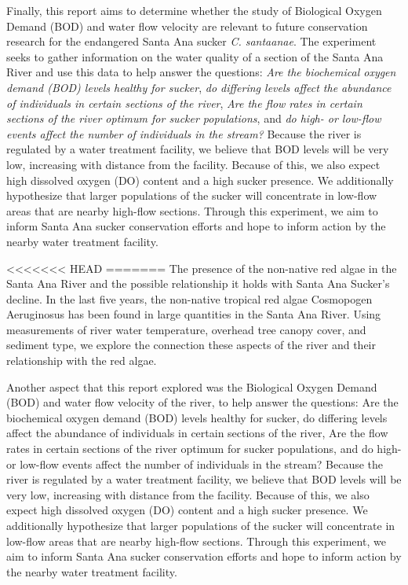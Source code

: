 \documentclass{article}\usepackage[]{graphicx}\usepackage[]{color}
\begin{document}
Finally, this report aims to determine whether the study of Biological Oxygen Demand (BOD) and water flow velocity are relevant to future conservation research for the endangered Santa Ana sucker \emph{C. santaanae}. The experiment seeks to gather information on the water quality of a section of the Santa Ana River and use this data to help answer the questions: \emph{Are the biochemical oxygen demand (BOD) levels healthy for sucker}, \emph{do differing levels affect the  abundance of individuals in certain sections of the river}, \emph{Are the flow rates in certain sections of the river optimum for sucker populations}, and \emph{do high- or low-flow events affect the number of individuals in the stream?} Because the river is regulated by a water treatment facility, we believe that BOD levels will be very low, increasing with distance from the facility. Because of this, we also expect high dissolved oxygen (DO) content and a high sucker presence. We additionally hypothesize that larger populations of the sucker will concentrate in low-flow areas that are nearby high-flow sections. Through this experiment, we aim to inform Santa Ana sucker conservation efforts and hope to inform action by the nearby water treatment facility. 


<<<<<<< HEAD
=======
The presence of the non-native red algae in the Santa Ana River and the possible relationship it holds with Santa Ana Sucker's decline. In the last five years, the non-native tropical red algae Cosmopogen Aeruginosus has been found in large quantities in the Santa Ana River. Using measurements of river water temperature, overhead tree canopy cover, and sediment type, we explore the connection these aspects of the river and their relationship with the red algae.


Another aspect that this report explored was the Biological Oxygen Demand (BOD) and water flow velocity of the river, to help answer the questions: Are the biochemical oxygen demand (BOD) levels healthy for sucker, do differing levels affect the abundance of individuals in certain sections of the river, Are the flow rates in certain sections of the river optimum for sucker populations, and do high- or low-flow events affect the number of individuals in the stream? Because the river is regulated by a water treatment facility, we believe that BOD levels will be very low, increasing with distance from the facility. Because of this, we also expect high dissolved oxygen (DO) content and a high sucker presence. We additionally hypothesize that larger populations of the sucker will concentrate in low-flow areas that are nearby high-flow sections. Through this experiment, we aim to inform Santa Ana sucker conservation efforts and hope to inform action by the nearby water treatment facility. 
\end{document}
